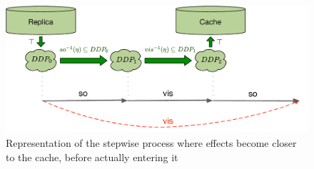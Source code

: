\begin{figure}[t]
	\centering
	\includegraphics[scale = 0.4]{Figures/Availability_deg.pdf}
\caption{Representation of the stepwise process where effects become closer to
the cache, before actually entering it}
\label{fig:avail_deg}
\end{figure}
